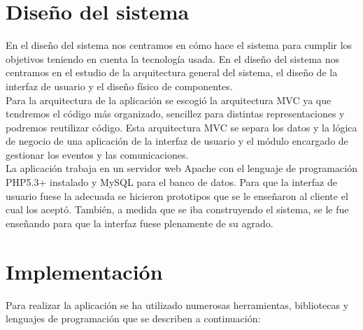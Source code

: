 \documentclass[a4paper,12pt]{article}
\begin{document}
\newpage
\section{\fontsize{12}{1}\selectfont Diseño del sistema}
\noindent En el diseño del sistema nos centramos en cómo hace el sistema para cumplir los objetivos teniendo en cuenta la tecnología usada. En el diseño del sistema nos centramos en el estudio de la arquitectura general del sistema, el diseño de la interfaz de usuario y el diseño físico de componentes.\\
Para la arquitectura de la aplicación se escogió la arquitectura MVC ya que tendremos el código más organizado, sencillez para distintas representaciones y podremos reutilizar código. Esta arquitectura MVC se separa los datos y la lógica de negocio de una aplicación de la interfaz de usuario y el módulo encargado de gestionar los eventos y las comunicaciones.\\
La aplicación trabaja en un servidor web Apache con el lenguaje de programación PHP5.3+ instalado y MySQL para el banco de datos.
Para que la interfaz de usuario fuese la adecuada se hicieron prototipos que se le enseñaron al cliente el cual los aceptó. También, a medida que se iba construyendo el sistema, se le fue enseñando para que la interfaz fuese plenamente de su agrado.

\section{\fontsize{12}{1}\selectfont Implementación}

\noindent Para realizar la aplicación se ha utilizado numerosas herramientas, bibliotecas y lenguajes de programación que se describen a continuación:
\end{document}
